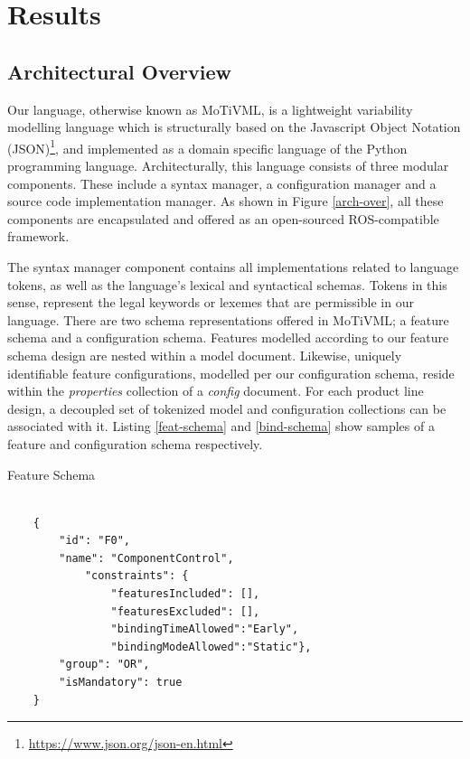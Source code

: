 \documentclass[conference]{IEEEtran}
\newcommand{\foot}[1]{\footnote{\url{#1}}}
\begin{document}
\section{Results}
\subsection{Architectural Overview}
Our language, otherwise known as MoTiVML, is a lightweight variability modelling language which is structurally based on the Javascript Object Notation (JSON)\foot{https://www.json.org/json-en.html}, and implemented as a domain specific language of the Python programming language. Architecturally, this language consists of three modular components. These include a syntax manager, a configuration manager and a source code implementation manager. As shown in Figure \ref{arch-over}, all these components are encapsulated and offered as an open-sourced ROS-compatible framework.

The syntax manager component contains all implementations related to language tokens, as well as the language's lexical and syntactical schemas. Tokens in this sense, represent the legal keywords or lexemes that are permissible in our language. There are two schema representations offered in MoTiVML; a feature schema and a configuration schema. Features modelled according to our feature schema design are nested within a model document. Likewise, uniquely identifiable feature configurations, modelled per our configuration schema, reside within the \textit{properties} collection of a \textit{config} document. For each product line design, a decoupled set of tokenized model and configuration collections can be associated with it. Listing \ref{feat-schema} and \ref{bind-schema} show samples of a feature and configuration schema respectively.

\begin{listing}[H]
\caption{Feature Schema}
\begin{verbatim}

    {
        "id": "F0",
        "name": "ComponentControl",
            "constraints": {
	            "featuresIncluded": [],
	            "featuresExcluded": [],
	            "bindingTimeAllowed":"Early",
	            "bindingModeAllowed":"Static"},
        "group": "OR",
        "isMandatory": true
    }

\end{verbatim}
\label{feat-schema}
\end{listing}
\end{document}
